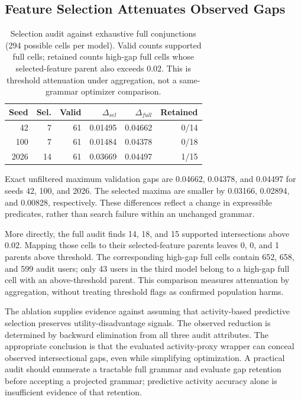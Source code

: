 \documentclass[sigconf,nonacm]{acmart}
\begin{document}
\subsection{Feature Selection Attenuates Observed Gaps}
\begin{table}[t]
\centering
\caption{Selection audit against exhaustive full conjunctions (294 possible cells per model). Valid counts supported full cells; retained counts high-gap full cells whose selected-feature parent also exceeds 0.02. This is threshold attenuation under aggregation, not a same-grammar optimizer comparison.}
\label{tab:selection-ablation}
\small
\begin{tabular}{rrrrrr}
\toprule
Seed & Sel. & Valid & $\Delta_{sel}$ & $\Delta_{full}$ & Retained \\
\midrule
42 & 7 & 61 & 0.01495 & 0.04662 & 0/14 \\
100 & 7 & 61 & 0.01484 & 0.04378 & 0/18 \\
2026 & 14 & 61 & 0.03669 & 0.04497 & 1/15 \\
\bottomrule
\end{tabular}
\end{table}

Exact unfiltered maximum validation gaps are 0.04662, 0.04378, and 0.04497 for seeds 42, 100, and 2026. The selected maxima are smaller by 0.03166, 0.02894, and 0.00828, respectively. These differences reflect a change in expressible predicates, rather than search failure within an unchanged grammar.

More directly, the full audit finds 14, 18, and 15 supported intersections above 0.02. Mapping those cells to their selected-feature parents leaves 0, 0, and 1 parents above threshold. The corresponding high-gap full cells contain 652, 658, and 599 audit users; only 43 users in the third model belong to a high-gap full cell with an above-threshold parent. This comparison measures attenuation by aggregation, without treating threshold flags as confirmed population harms.

The ablation supplies evidence against assuming that activity-based predictive selection preserves utility-disadvantage signals. The observed reduction is determined by backward elimination from all three audit attributes. The appropriate conclusion is that the evaluated activity-proxy wrapper can conceal observed intersectional gaps, even while simplifying optimization. A practical audit should enumerate a tractable full grammar and evaluate gap retention before accepting a projected grammar; predictive activity accuracy alone is insufficient evidence of that retention.
\end{document}
